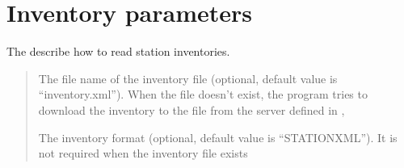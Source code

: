 \documentclass[letterpaper,10pt,english]{sphinxmanual}
\begin{document}
\section{Inventory parameters}
\label{\detokenize{configuration:inventory-parameters}}
\sphinxAtStartPar
The  describe how to read station inventories.
\begin{quote}\begin{description}
\sphinxAtStartPar
The file name of the inventory file (optional, default value is “inventory.xml”).
When the file doesn’t exist, the program tries to download the inventory to the file
from the server defined in {\hyperref[\detokenize{configuration:stream-parameters}]{}},

\sphinxAtStartPar
The inventory format (optional, default value is “STATIONXML”).
It is not required when the inventory file exists

\end{description}\end{quote}
\end{document}
